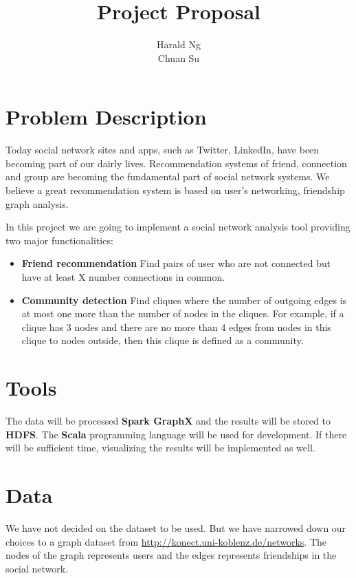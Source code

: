 \documentclass[12pt]{article}
\begin{document}
\title{Project Proposal}
\author{Harald Ng\\ %
Chuan Su}

\maketitle

\section{Problem Description}

Today social network sites and apps, such as Twitter, LinkedIn, have been becoming part of our dairly lives.
Recommendation systems of friend, connection and group are becoming the fundamental part of social network systems.
We believe a great recommendation system is based on user's networking, friendship graph analysis.

In this project we are going to implement a social network analysis tool providing two major functionalities:
  \begin{itemize}
\item \textbf{Friend recommendation}
 Find pairs of user who are not connected but have at least X number connections in common.

\item \textbf{Community detection}
 Find cliques where the number of outgoing edges is at most one more than the number of nodes in the cliques. For example, if a clique has 3 nodes and there are no more than 4 edges from nodes in this clique to nodes outside, then this clique is defined as a community.
  \end{itemize}
\section{Tools}
The data will be processed \textbf{Spark GraphX} and the results will be stored to \textbf{HDFS}. The \textbf{Scala} programming language will be used for development. If there will be sufficient time, visualizing the results will be implemented as well.

\section{Data}
We have not decided on the dataset to be used. But we have narrowed down our choices to a graph dataset from \url{http://konect.uni-koblenz.de/networks}. The nodes of the graph represents users and the edges represents friendships in the social network. 
 
\end{document}
